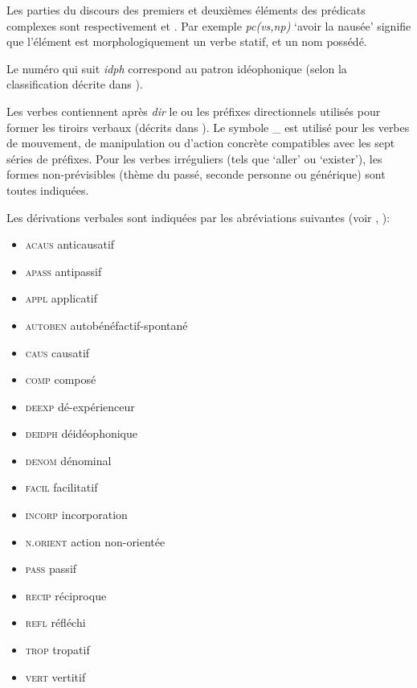 Les parties du discours des premiers et deuxièmes éléments des prédicats complexes sont respectivement  et . Par exemple  \textit{pc(vs,np)} `avoir la nausée' signifie que l'élément  est morphologiquement un verbe statif, et  un nom possédé.

Le numéro qui suit \textit{idph} correspond au patron idéophonique (selon la classification décrite dans \citealt{japhug14ideophones}).

Les verbes contiennent après \textit{dir} le ou les préfixes directionnels utilisés pour former les tiroirs verbaux (décrits dans \citealt[267-9]{jacques14linking}). Le symbole \_  est utilisé pour les verbes de mouvement, de manipulation ou d'action concrète compatibles avec les sept séries de préfixes. Pour les verbes irréguliers (tels que  `aller' ou   `exister'), les formes non-prévisibles (thème du passé, seconde personne ou générique) sont toutes indiquées. 

Les dérivations verbales sont indiquées par les abréviations suivantes (voir \citealt{jacques12incorp, jacques13tropative, jacques14antipassive,  jacques15spontaneous}, \citeyear{jacques15causative, jacques16relatives}):

\begin{itemize}
\item \textsc{acaus} anticausatif 
\item \textsc{apass} antipassif
\item \textsc{appl} applicatif
\item \textsc{autoben} autobénéfactif-spontané
\item \textsc{caus} causatif 
\item \textsc{comp} composé
\item \textsc{deexp} dé-expérienceur
\item \textsc{deidph} déidéophonique
\item \textsc{denom} dénominal
\item \textsc{facil} facilitatif
\item \textsc{incorp} incorporation
\item \textsc{n.orient} action non-orientée
\item \textsc{pass} passif
\item \textsc{recip} réciproque
\item \textsc{refl} réfléchi
\item \textsc{trop} tropatif
\item \textsc{vert} vertitif
\end{itemize}


